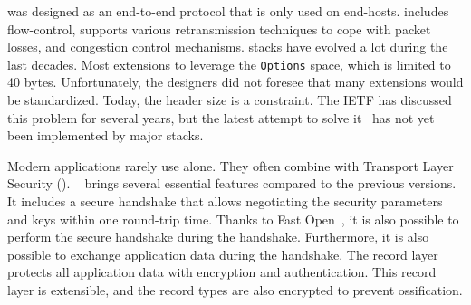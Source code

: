 
\tcp was designed as an end-to-end protocol that is only used on end-hosts.
\tcp includes flow-control, supports various retransmission techniques to cope
with packet losses, and congestion control mechanisms. \tcp stacks have evolved
a lot during the last decades. Most extensions to \tcp leverage the \tcp
\texttt{Options} space, which is limited to 40 bytes. Unfortunately, the \tcp
designers did not foresee that many \tcp extensions would be standardized.
Today, the \tcp header size is a constraint. The IETF has discussed this
problem for several years, but the latest attempt to solve
it~\cite{draft-ietf-tcpm-tcp-edo-10} has not yet been implemented by major
\tcp stacks.

Modern applications rarely use \tcp alone. They often combine \tcp with Transport Layer Security (\tls). ~\cite{rfc8446} brings several essential features compared to the previous versions. It includes a secure handshake that allows negotiating the security parameters and keys within one round-trip time. Thanks to \tcp Fast Open~\cite{radhakrishnan2011tcp}, it is also possible to perform the secure handshake during the \tcp handshake. Furthermore, it is also possible to exchange application data during the handshake. The  record layer protects all application data with encryption and authentication. This record layer is extensible, and the \tls record types are also encrypted to prevent ossification.

